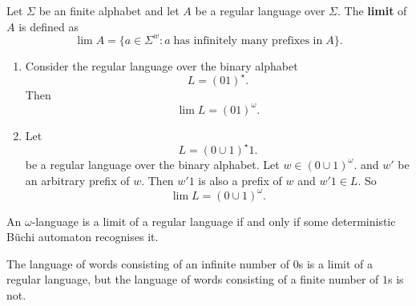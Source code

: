 \begin{definition}
    Let $\Sigma$ be an finite alphabet
    and let $A$ be a regular language over $\Sigma$.
    The \textbf{limit} of $A$ is defined as
    \[
        \operatorname{lim}{A} =
        \{a \in \Sigma^w: a \;\text{has infinitely many prefixes in}\;A\}.
    \]
\end{definition}

\begin{example}
    \hfill
    \begin{enumerate}
        \item 
            Consider the regular language over the binary alphabet
            \[
                L = (01)^\star.
            \]
            Then
            \[
                \lim{L} = (01)^\omega.
            \]

        \item 
            Let
            \[
                L = (0 \cup 1)^\star 1.
            \]
            be a regular language over the binary alphabet.
            Let $w \in (0\cup1)^\omega$.
            and $w'$ be an arbitrary prefix of $w$.
            Then $w'1$ is also a prefix of $w$ and $w'1 \in L$.
            So
            \[
                \lim L = (0 \cup 1)^\omega.
            \]
    \end{enumerate}
\end{example}

\begin{theorem}
    An $\omega$-language is a limit of a regular language
    if and only if some deterministic B\"uchi automaton recognises it.
\end{theorem}

\begin{example}
    The language of words consisting of an infinite number of $0$s
    is a limit of a regular language, but the language of words
    consisting of a finite number of $1$s is not.
\end{example}

